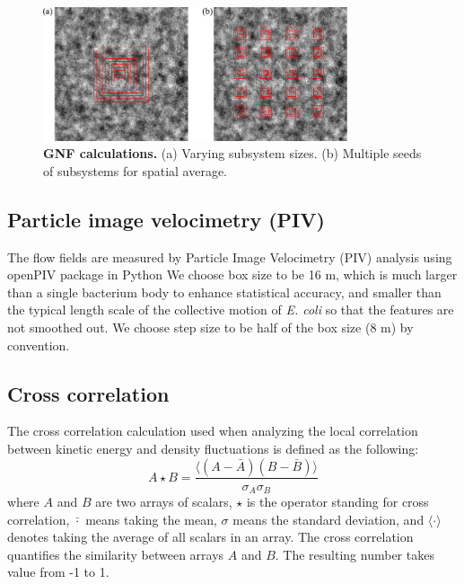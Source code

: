 \documentclass[preprint,aps,prl,amsmath,amssymb,longbibliography]{revtex4-2}
\begin{document}
\begin{figure}[!]
\begin{center}
\includegraphics[width=0.8\textwidth]{figures/GNF-calculation/v1.pdf}
\caption[GNF calculations]
{
\textbf{GNF calculations.}
(a) Varying subsystem sizes.
(b) Multiple seeds of subsystems for spatial average.
}
\label{GNF-calculation}
\end{center}
\end{figure}


\subsection{Particle image velocimetry (PIV)}

The flow fields are measured by Particle Image Velocimetry (PIV) analysis using openPIV package in Python %
We choose box size to be 16 \textmu m, which is much larger than a single bacterium body to enhance statistical accuracy, and smaller than the typical length scale of the collective motion of \textit{E. coli} so that the features are not smoothed out. We choose step size to be half of the box size (8 \textmu m) by convention.

\subsection{Cross correlation}

The cross correlation calculation used when analyzing the local correlation between kinetic energy and density fluctuations is defined as the following:
\begin{equation}
\label{eq:cross-correlation}
A\star B = \frac{\langle(A-\bar A)(B-\bar B)\rangle}{\sigma_A\sigma_B}
\end{equation}
where $A$ and $B$ are two arrays of scalars, $\star$ is the operator standing for cross correlation, $\bar\cdot$ means taking the mean, $\sigma$ means the standard deviation, and $\langle\cdot\rangle$ denotes taking the average of all scalars in an array. The cross correlation quantifies the similarity between arrays $A$ and $B$. The resulting number takes value from -1 to 1.
\end{document}
